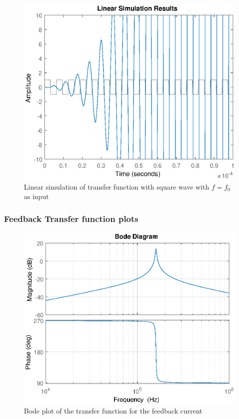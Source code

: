 \begin{figure}
    \centering
    \includegraphics[width=\textwidth]{img/Simulation.eps}
    \caption{Linear simulation of transfer function with square wave with $f=f_0$ as input}
    \label{fig:my_label}
\end{figure}


\subsubsection{Feedback Transfer function plots}

\begin{figure}
    \centering
    \includegraphics[width=\textwidth]{img/FeedbackBode.eps}
    \caption{Bode plot of the transfer function for the feedback current}
    \label{fig:my_label}
\end{figure}

